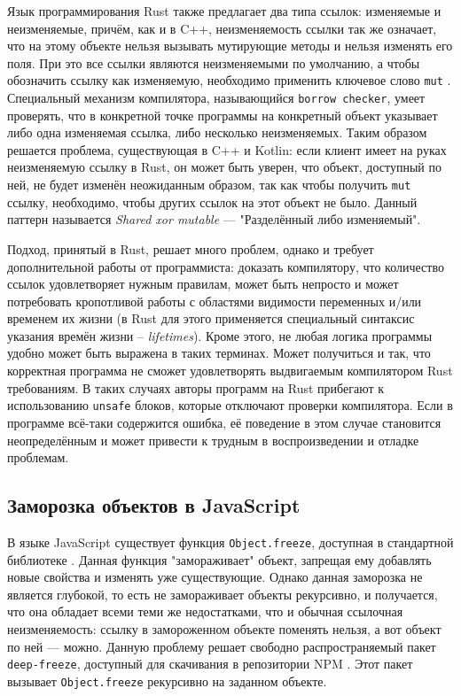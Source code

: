 \documentclass[specification,annotation,times]{itmo-student-thesis}
\begin{document}
Язык программирования Rust также предлагает два типа ссылок: изменяемые и неизменяемые, причём, как и в C++, неизменяемость ссылки так же означает, что на этому объекте нельзя вызывать мутирующие методы и нельзя изменять его поля. При это все ссылки являются неизменяемыми по умолчанию, а чтобы обозначить ссылку как изменяемую, необходимо применить ключевое слово \texttt{mut} \cite{rust-mut}. 
Специальный механизм компилятора, называющийся \texttt{borrow checker}, умеет проверять, что в конкретной точке программы на конкретный объект указывает либо одна изменяемая ссылка, либо несколько неизменяемых.
Таким образом решается проблема, существующая в C++ и Kotlin: если клиент имеет на руках неизменяемую ссылку в Rust, он может быть уверен, что объект, доступный по ней, не будет изменён неожиданным образом, так как чтобы получить \texttt{mut} ссылку, необходимо, чтобы других ссылок на этот объект не было.
Данный паттерн называется \textit{Shared xor mutable} --- "Разделённый либо изменяемый".

Подход, принятый в Rust, решает много проблем, однако и требует дополнительной работы от программиста: доказать компилятору, что количество ссылок удовлетворяет нужным правилам, может быть непросто и может потребовать кропотливой работы с областями видимости переменных и/или временем их жизни (в Rust для этого применяется специальный синтаксис указания времён жизни -- \textit{lifetimes}).
Кроме этого, не любая логика программы удобно может быть выражена в таких терминах. Может получиться и так, что корректная программа не сможет удовлетворять выдвигаемым компилятором Rust требованиям.
В таких случаях авторы программ на Rust прибегают к использованию \texttt{unsafe} блоков, которые отключают проверки компилятора.
Если в программе всё-таки содержится ошибка, её поведение в этом случае становится неопределённым и может привести к трудным в воспроизведении и отладке проблемам.

\subsection{Заморозка объектов в JavaScript}\label{js_freeze}

В языке JavaScript существует функция \texttt{Object.freeze}, доступная в стандартной библиотеке \cite{EcmaScript}. Данная функция "замораживает" объект, запрещая ему добавлять новые свойства и изменять уже существующие.
Однако данная заморозка не является глубокой, то есть не замораживает объекты рекурсивно, и получается, что она обладает всеми теми же недостатками, что и обычная ссылочная неизменяемость: ссылку в замороженном объекте поменять нельзя, а вот объект по ней --- можно.
Данную проблему решает свободно распространяемый пакет \texttt{deep-freeze}, доступный для скачивания в репозитории NPM \cite{js-deep-freeze}. Этот пакет вызывает \texttt{Object.freeze} рекурсивно на заданном объекте.
\end{document}
